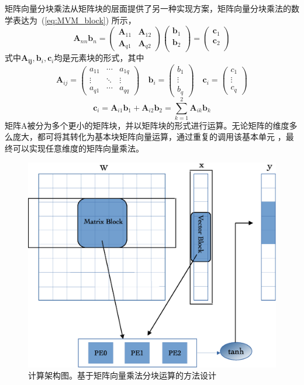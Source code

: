 矩阵向量分块乘法从矩阵块的层面提供了另一种实现方案，矩阵向量分块乘法的数学表达为~(\ref{eq:MVM_block}) 所示，
\begin{equation}
	\mathbf{A}_{nn} \mathbf{b}_n = 
	\begin{pmatrix}
		\mathbf{A}_{11} & \mathbf{A}_{12}  \\
  		\mathbf{A}_{q1} & \mathbf{A}_{q2} 
 \end{pmatrix}
	\begin{pmatrix}
        \mathbf{b}_{1}	\\ 
        \mathbf{b}_{2}	\\
	\end{pmatrix}
  =
	\begin{pmatrix}
        \mathbf{c}_{1}	\\ 
        \mathbf{c}_{2}	\\
     \end{pmatrix}
\label{eq:MVM_block}
\end{equation}
式中\(\mathbf{A_{ij}},\mathbf{b}_i,\mathbf{c}_i\)均是元素块的形式，其中
\begin{equation}
	\mathbf{A}_{ij} = 
		\begin{pmatrix}
		a_{11} & \cdots & a_{1q} \\
  		\vdots  & \ddots & \vdots  \\
  		a_{q1} & \cdots & a_{qq}
		\end{pmatrix}
	\quad
	\mathbf{b}_i = 
		\begin{pmatrix}
        b_{1}	\\
		\vdots	\\	
        b_{q}	
	\end{pmatrix}
	\quad
	\mathbf{c}_i = 
		\begin{pmatrix}
        c_{1}	\\
		\vdots	\\	
        c_{q}	
	\end{pmatrix}
\end{equation}
$$	\mathbf{c}_{i}= \mathbf{A}_{i1} \mathbf{b}_{1} + \mathbf{A}_{i2} \mathbf{b}_{2} = \sum_{k=1}^2 \mathbf{A}_{ik}\mathbf{b}_{k}	$$
矩阵A被分为多个更小的矩阵块，并以矩阵块的形式进行运算。无论矩阵的维度多么庞大，都可将其转化为基本块矩阵向量运算，通过重复的调用该基本单元
，最终可以实现任意维度的矩阵向量乘法。
\begin{figure}[H]
	\centering
	\includegraphics[width=0.6\columnwidth]{exp/fig_compute.eps}
	\caption{计算架构图。基于矩阵向量乘法分块运算的方法设计}
	\label{fig:compute}
\end{figure}
